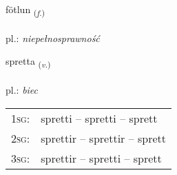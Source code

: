 \documentclass[frontgrid, backgrid]{flacards}\usepackage[]{graphicx}\usepackage[]{xcolor}
\begin{document}
\renewcommand{\flhead}{\vskip5pt \fboxsep=0pt {\small\bfseries\footnotesize Nafnorð | rzeczownik}}
\renewcommand{\fcfoot}{\vskip5pt \fboxsep=0pt \hspace{2pt}{\small\bfseries\footnotesize 3K}}

\renewcommand{\blhead}{\vskip5pt {\small\bfseries\footnotesize Nafnorð | rzeczownik }}
\renewcommand{\bcfoot}{\vskip5pt \hspace{2pt}{\small\bfseries\footnotesize 3K}}


{fötlun \small{\textsubscript{(\textit{f.})}} \\[1ex] %
\textphonetic{[fœhtlʏn]} \\
pl.: \emph{niepełnosprawność} \\  [2ex]
\renewcommand*{\arraystretch}{0.8}
}

\renewcommand{\flhead}{\vskip5pt \fboxsep=0pt {\small\bfseries\footnotesize Sagnorð | czasownik}}
\renewcommand{\fcfoot}{\vskip5pt \fboxsep=0pt \hspace{2pt}{\small\bfseries\footnotesize 3K}}

\renewcommand{\blhead}{\vskip5pt {\small\bfseries\footnotesize Sagnorð | czasownik }}
\renewcommand{\bcfoot}{\vskip5pt \hspace{2pt}{\small\bfseries\footnotesize 3K}}


{spretta \small{\textsubscript{(\textit{v.})}} \\[1ex] %
\textphonetic{[sprɛhta]} \\
pl.: \emph{biec} \\  [2ex]
\renewcommand*{\arraystretch}{0.8}
\begin{tabular}{p{1cm}l}
\textsc{1sg}: & spretti -- spretti -- sprett \\ 
\textsc{2sg}: & sprettir -- sprettir -- sprett \\ 
\textsc{3sg}: & sprettir -- spretti -- sprett \\ 
\end{tabular}
}
\end{document}
